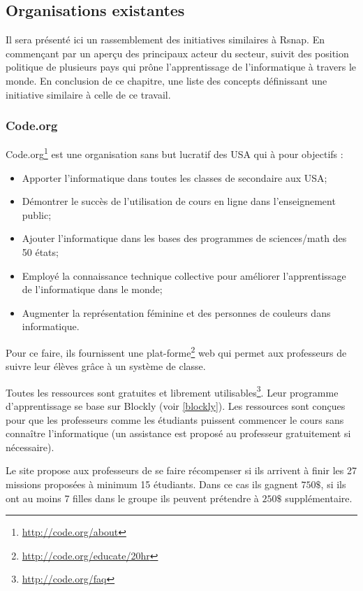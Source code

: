 \subsection{Organisations existantes}
Il sera présenté ici un rassemblement des initiatives similaires à Rsnap. En commençant par un aperçu des principaux acteur du secteur, suivit des position politique de plusieurs pays qui prône l'apprentissage de l'informatique à travers le monde. En conclusion de ce chapitre, une liste des concepts définissant une initiative similaire à celle de ce travail.
\subsubsection{Code.org}
Code.org\footnote{\url{http://code.org/about}} est une organisation sans but lucratif des USA qui à pour objectifs :
\begin{itemize}
  \item Apporter l'informatique dans toutes les classes de secondaire aux USA;
  \item Démontrer le succès de l'utilisation de cours en ligne dans l'enseignement public;
  \item Ajouter l'informatique dans les bases des programmes de sciences/math des 50 états;
  \item Employé la connaissance technique collective pour améliorer l'apprentissage de l'informatique dans le monde;
  \item Augmenter la représentation féminine et des personnes de couleurs dans informatique.
\end{itemize}

Pour ce faire, ils fournissent une plat-forme\footnote{\url{http://code.org/educate/20hr}} web qui permet aux professeurs de suivre leur élèves grâce à un système de classe.

Toutes les ressources sont gratuites et librement utilisables\footnote{\url{http://code.org/faq}}. Leur programme d'apprentissage se base sur Blockly (voir \ref{blockly}).
Les ressources sont conçues pour que les professeurs comme les étudiants puissent commencer le cours sans connaître l'informatique (un assistance est proposé au professeur gratuitement si nécessaire).

Le site propose aux professeurs de se faire récompenser si ils arrivent à finir les 27 missions proposées à minimum 15 étudiants. Dans ce cas ils gagnent $750\$$, si ils ont au moins 7 filles dans le groupe ils peuvent prétendre à $250\$$ supplémentaire.


